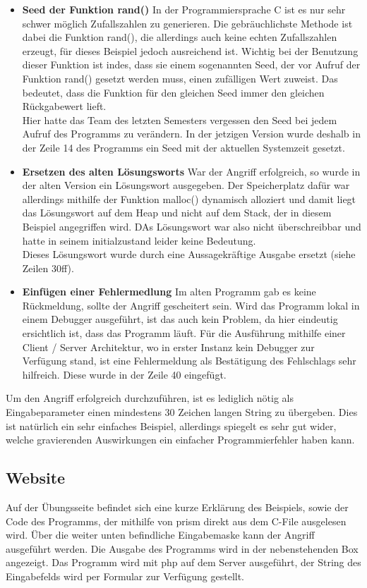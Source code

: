 \begin{itemize}
	\item \textbf{Seed der Funktion rand()} In der Programmiersprache C ist es nur sehr schwer möglich Zufallszahlen zu generieren. Die gebräuchlichste Methode ist dabei die Funktion rand(), die allerdings auch keine echten Zufallszahlen erzeugt, für dieses Beispiel jedoch ausreichend ist. Wichtig bei der Benutzung dieser Funktion ist indes, dass sie einem sogenannten Seed, der vor Aufruf der Funktion rand() gesetzt werden muss, einen \glqq{}zufälligen\grqq{} Wert zuweist. Das bedeutet, dass die Funktion für den gleichen Seed immer den gleichen Rückgabewert lieft. \\
	Hier hatte das Team des letzten Semesters vergessen den Seed bei jedem Aufruf des Programms zu verändern. In der jetzigen Version wurde deshalb in der Zeile 14 des Programms ein Seed mit der aktuellen Systemzeit gesetzt.
	\item \textbf{Ersetzen des alten Lösungsworts} War der Angriff erfolgreich, so wurde in der alten Version ein Lösungswort ausgegeben. Der Speicherplatz dafür war allerdings mithilfe der Funktion malloc() dynamisch alloziert und damit liegt das Lösungswort auf dem Heap und nicht auf dem Stack, der in diesem Beispiel angegriffen wird. DAs Lösungswort war also nicht überschreibbar und hatte in seinem initialzustand leider keine Bedeutung. \\
	Dieses Lösungswort wurde durch eine Aussagekräftige Ausgabe ersetzt (siehe Zeilen 30ff).
	\item \textbf{Einfügen einer Fehlermedlung} Im alten Programm gab es keine Rückmeldung, sollte der Angriff gescheitert sein. Wird das Programm lokal in einem Debugger ausgeführt, ist das auch kein Problem, da hier eindeutig ersichtlich ist, dass das Programm läuft. Für die Ausführung mithilfe einer Client / Server Architektur, wo in erster Instanz kein Debugger zur Verfügung stand, ist eine Fehlermeldung als Bestätigung des Fehlschlags sehr hilfreich. Diese wurde in der Zeile 40 eingefügt.
\end{itemize}

Um den Angriff erfolgreich durchzuführen, ist es lediglich nötig als Eingabeparameter einen mindestens 30 Zeichen langen String zu übergeben. Dies ist natürlich ein sehr einfaches Beispiel, allerdings spiegelt es sehr gut wider, welche gravierenden Auswirkungen ein einfacher Programmierfehler haben kann.

\subsection{Website}
Auf der Übungsseite befindet sich eine kurze Erklärung des Beispiels, sowie der Code des Programms, der mithilfe von prism direkt aus dem C-File ausgelesen wird. Über die weiter unten befindliche Eingabemaske kann der Angriff ausgeführt werden. Die Ausgabe des Programms wird in der nebenstehenden Box angezeigt. Das Programm wird mit php auf dem Server ausgeführt, der String des Eingabefelds wird per Formular zur Verfügung gestellt.

